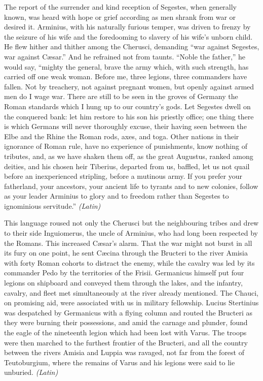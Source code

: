 The report of the surrender and kind reception of Segestes, when generally known, was heard with hope or grief according as men shrank from war or desired it. Arminius, with his naturally furious temper, was driven to frenzy by the seizure of his wife and the foredooming to slavery of his wife's unborn child. He flew hither and thither among the Cherusci, demanding ``war against Segestes, war against Cæsar.'' And he refrained not from taunts. ``Noble the father,'' he would say, ``mighty the general, brave the army which, with such strength, has carried off one weak woman. Before me, three legions, three commanders have fallen. Not by treachery, not against pregnant women, but openly against armed men do I wage war. There are still to be seen in the groves of Germany the Roman standards which I hung up to our country's gods. Let Segestes dwell on the conquered bank: let him restore to his son his priestly office; one thing there is which Germans will never thoroughly excuse, their having seen between the Elbe and the Rhine the Roman rods, axes, and toga. Other nations in their ignorance of Roman rule, have no experience of punishments, know nothing of tributes, and, as we have shaken them off, as the great Augustus, ranked among deities, and his chosen heir Tiberius, departed from us, baffled, let us not quail before an inexperienced stripling, before a mutinous army. If you prefer your fatherland, your ancestors, your ancient life to tyrants and to new colonies, follow as your leader Arminius to glory and to freedom rather than Segestes to ignominious servitude.'' \emph{(Latin)}


This language roused not only the Cherusci but the neighbouring tribes and drew to their side Inguiomerus, the uncle of Arminius, who had long been respected by the Romans. This increased Cæsar's alarm. That the war might not burst in all its fury on one point, he sent Cæcina through the Bructeri to the river Amisia with forty Roman cohorts to distract the enemy, while the cavalry was led by its commander Pedo by the territories of the Frisii. Germanicus himself put four legions on shipboard and conveyed them through the lakes, and the infantry, cavalry, and fleet met simultaneously at the river already mentioned. The Chauci, on promising aid, were associated with us in military fellowship. Lucius Stertinius was despatched by Germanicus with a flying column and routed the Bructeri as they were burning their possessions, and amid the carnage and plunder, found the eagle of the nineteenth legion which had been lost with Varus. The troops were then marched to the furthest frontier of the Bructeri, and all the country between the rivers Amisia and Luppia was ravaged, not far from the forest of Teutoburgium, where the remains of Varus and his legions were said to lie unburied. \emph{(Latin)}

